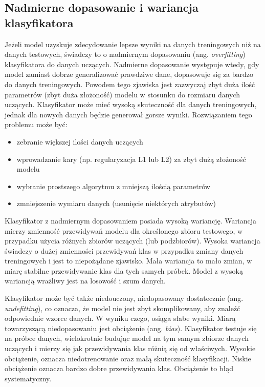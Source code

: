 \subsection{Nadmierne dopasowanie i wariancja klasyfikatora}
 
Jeżeli model uzyskuje zdecydowanie lepsze wyniki na danych treningowych niż na danych testowych, świadczy to o nadmiernym dopasowaniu (ang. \textit{overfitting}) klasyfikatora do danych uczących. Nadmierne dopasowanie występuje wtedy, gdy model zamiast dobrze generalizować prawdziwe dane, dopasowuje się za bardzo do danych treningowych. Powodem tego zjawiska jest zazwyczaj zbyt duża ilość parametrów (zbyt duża złożoność) modelu w stosunku do rozmiaru danych uczących. Klasyfikator może mieć wysoką skuteczność dla danych treningowych, jednak dla nowych danych będzie generował gorsze wyniki. Rozwiązaniem tego problemu może być:
\begin{itemize}
	\item zebranie większej ilości danych uczących
	\item wprowadzanie kary (np. regularyzacja L1 lub L2) za zbyt dużą złożoność modelu
	\item wybranie prostszego algorytmu z mniejszą ilością parametrów
	\item zmniejszenie wymiaru danych (usunięcie niektórych atrybutów)
\end{itemize}
Klasyfikator z nadmiernym dopasowaniem posiada wysoką wariancję. Wariancja mierzy zmienność przewidywań modelu dla określonego zbioru testowego, w przypadku użycia różnych zbiorów uczących (lub podzbiorów). Wysoka wariancja świadczy o dużej zmienności przewidywań klas w przypadku zmiany danych treningowych i jest to niepożądane zjawisko. Mała wariancja to mało zmian, w miarę stabilne przewidywanie klas dla tych samych próbek. Model z wysoką wariancją wrażliwy jest na losowość i szum danych. \par
Klasyfikator może być także niedouczony, niedopasowany dostatecznie (ang. \textit{undefitting}), co oznacza, że model nie jest zbyt skomplikowany, aby znaleźć odpowiednie wzorce danych. W wyniku czego, osiąga słabe wyniki. Miarą towarzyszącą niedopasowaniu jest obciążenie (ang. \textit{bias}). Klasyfikator testuje się na próbce danych, wielokrotnie budując model na tym samym zbiorze danych uczących i mierzy się jak przewidywania klas różnią się od właściwych. Wysokie obciążenie, oznacza niedotrenowanie oraz małą skuteczność klasyfikacji. Niskie obciążenie oznacza bardzo dobre przewidywania klas. Obciążenie to błąd systematyczny. \par
